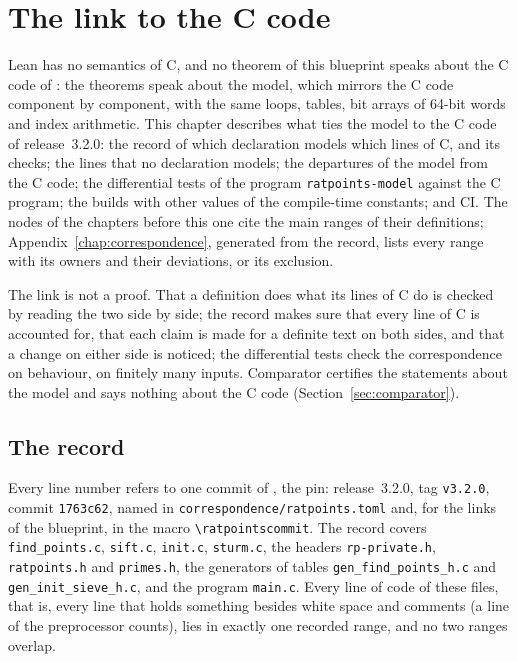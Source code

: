 \chapter{The link to the C code}\label{chap:ccode}

Lean has no semantics of C, and no theorem of this blueprint speaks about the C code of \ratpoints{}:
the theorems speak about the model, which mirrors the C code component by component, with the same
loops, tables, bit arrays of 64-bit words and index arithmetic. This chapter describes what ties
the model to the C code of release~3.2.0: the record of which declaration models which lines of C,
and its checks; the lines that no declaration models; the departures of the model from the C code;
the differential tests of the program \verb|ratpoints-model| against the C program; the builds with
other values of the compile-time constants; and CI. The nodes of the chapters before this one cite
the main ranges of their definitions; Appendix~\ref{chap:correspondence}, generated from the
record, lists every range with its owners and their deviations, or its exclusion.

The link is not a proof. That a definition does what its lines of C do is checked by reading the
two side by side; the record makes sure that every line of C is accounted for, that each claim is
made for a definite text on both sides, and that a change on either side is noticed; the
differential tests check the correspondence on behaviour, on finitely many inputs. Comparator
certifies the statements about the model and says nothing about the C code
(Section~\ref{sec:comparator}).

\section{The record}\label{sec:ccodeRecord}

Every line number refers to one commit of \ratpoints{}, the pin: release~3.2.0, tag \verb|v3.2.0|,
commit \verb|1763c62|, named in \verb|correspondence/ratpoints.toml| and, for the links of the
blueprint, in the macro \verb|\ratpointscommit|. The record covers \verb|find_points.c|,
\verb|sift.c|, \verb|init.c|, \verb|sturm.c|, the headers \verb|rp-private.h|, \verb|ratpoints.h|
and \verb|primes.h|, the generators of tables \verb|gen_find_points_h.c| and
\verb|gen_init_sieve_h.c|, and the program \verb|main.c|. Every line of code of these files, that
is, every line that holds something besides white space and comments (a line of the preprocessor
counts), lies in exactly one recorded range, and no two ranges overlap.

